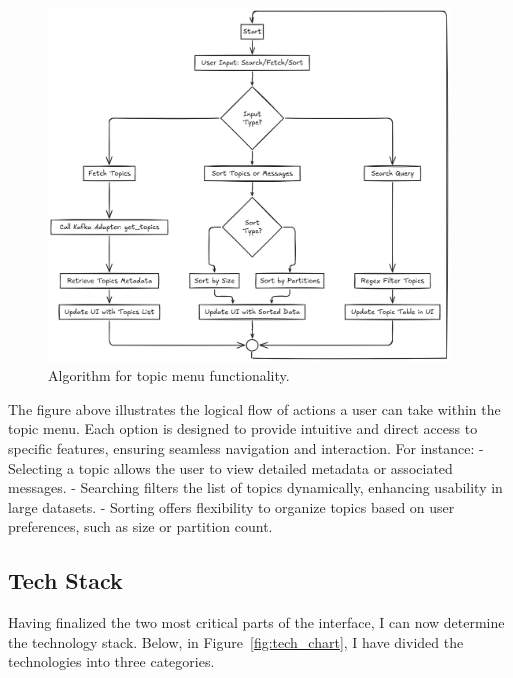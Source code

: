 \documentclass[10pt , a4paper]{report}
\begin{document}
\begin{figure}[htbp]
  \begin{center}
    \includegraphics[width=0.95\textwidth]{imgs/TopicsAlgorithm.png}
  \end{center}
  \caption{Algorithm for topic menu functionality.}\label{fig:}
\end{figure}

The figure above illustrates the logical flow of actions a user can take within the topic menu. Each option is designed to provide intuitive and direct access to specific features, ensuring seamless navigation and interaction. For instance:
- Selecting a topic allows the user to view detailed metadata or associated messages.
- Searching filters the list of topics dynamically, enhancing usability in large datasets.
- Sorting offers flexibility to organize topics based on user preferences, such as size or partition count.


\newpage
\subsection{Tech Stack}

Having finalized the two most critical parts of the interface, I can now determine the technology stack. Below, in Figure~\ref{fig:tech_chart}, I have divided the technologies into three categories.
\end{document}
